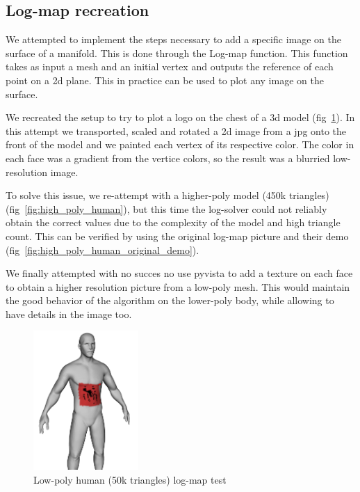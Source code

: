\documentclass[sigconf, nonacm]{acmart}
\begin{document}
\subsection{Log-map recreation}

We attempted to implement the steps necessary to add a specific image
on the surface of a manifold. This is done through the Log-map function.
This function takes as input a mesh and an initial vertex and outputs
the reference of each point on a 2d plane. This in practice can be used to
plot any image on the surface.

We recreated the setup to try to plot a logo on the chest of a 3d model
(fig~\ref{fig:low_poly_human}). In this attempt we transported, scaled and rotated a
2d image from a jpg onto the front of the model and we painted each
vertex of its respective color. The color in each face was a gradient from
the vertice colors, so the result was a blurried low-resolution image. 

To solve this issue, we re-attempt with a higher-poly model (450k triangles) (fig~\ref{fig:high_poly_human}),
but this time the log-solver could not reliably obtain the correct values due to the complexity of the model
and high triangle count. This can be verified by using the original log-map
picture and their demo (fig~\ref{fig:high_poly_human_original_demo}).

We finally attempted with no succes no use pyvista to add a texture on each face
to obtain a higher resolution picture from a low-poly mesh. This would maintain
the good behavior of the algorithm on the lower-poly body, while allowing to
have details in the image too. 

\begin{figure}
  \centering
  \includegraphics[width=4cm]{human_spiderman.png}
  \caption{Low-poly human (50k triangles) log-map test}
  \label{fig:low_poly_human}
\end{figure}
\end{document}
